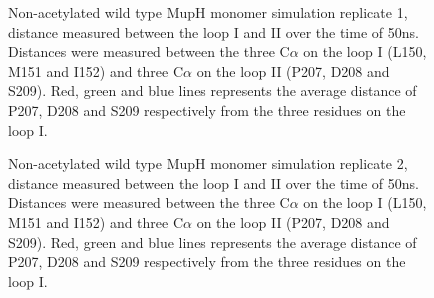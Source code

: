 		\setlength\fboxsep{5pt}
		\setlength\fboxrule{1.5pt}
		\begin{figure}[htbp]
		\centering
		\caption[Non-acetylated wild type MupH monomer simulation replicate 1, distance measured between the loop I and II over the time of 50ns.]{Non-acetylated wild type MupH monomer simulation replicate 1, distance measured between the loop I and II over the time of 50ns. Distances were measured between the three C$ \alpha $ on the loop I (L150, M151 and I152) and three C$ \alpha $ on the loop II (P207, D208 and S209). Red, green and blue lines represents the average distance of P207, D208 and S209 respectively from the three residues on the loop I.}
		\label{fig:MuphSim0}
		\end{figure}	

		\setlength\fboxsep{5pt}
		\setlength\fboxrule{1.5pt}
		\begin{figure}[htbp]
		\centering
		\caption[Non-acetylated wild type MupH monomer simulation replicate 2, distance measured between the loop I and II over the time of 50ns.]{Non-acetylated wild type MupH monomer simulation replicate 2, distance measured between the loop I and II over the time of 50ns. Distances were measured between the three C$ \alpha $ on the loop I (L150, M151 and I152) and three C$ \alpha $ on the loop II (P207, D208 and S209). Red, green and blue lines represents the average distance of P207, D208 and S209 respectively from the three residues on the loop I.}
		\label{fig:MuphSim1}
		\end{figure}

